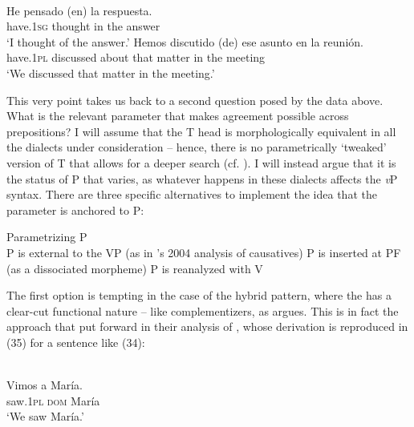 \documentclass[output=paper]{langsci/langscibook}
\begin{document}
\ea%
    \label{ex:gallego:32}\\
    \ea
    \gll He             pensado (en) la     respuesta.        \\
         have{}.\textsc{1sg}  thought    in   the   answer\\
    \glt ‘I thought of the answer.’
    \ex
    \gll Hemos      discutido  (de)     ese  asunto  en  la   reunión.  \\
         have{}.\textsc{1pl}  discussed  about  that  matter  in  the meeting\\
    \glt ‘We discussed that matter in the meeting.’
    \z
\z

This very point takes us back to a second question posed by the data above. What is the relevant parameter that makes agreement possible across prepositions? I will assume that the T head is morphologically equivalent in all the  dialects under consideration – hence, there is no parametrically ‘tweaked’ version of T that allows for a deeper search (cf. \citealt{Chomsky2001Derivation}). I will instead argue that it is the status of P that varies, as whatever happens in these dialects affects the \textit{v}P syntax. There are three specific alternatives to implement the idea that the parameter is anchored to P:

\ea%
    Parametrizing P\label{ex:gallego:33}\\
    \ea P is external to the VP (as in \citeauthor{Kayne2004}'s 2004 analysis of causatives)
    \ex P is inserted at PF (as a dissociated morpheme)
    \ex P is reanalyzed with V
\z
\z

The first option is tempting in the case of the hybrid pattern, where the  has a clear-cut functional nature – like complementizers, as \citet{Kayne2004} argues. This is in fact the approach that \citet{Ordóñez2016} put forward in their analysis of \DOM, whose derivation is reproduced in (35) for a sentence like (34):\largerpage[-1]

\ea%
    \label{ex:gallego:34}\\
    \gll   Vimos     a          María.\\
           saw{}.\textsc{1pl}  \textsc{dom}   María\\
    \glt   ‘We saw María.’
\z
  
\end{document}
